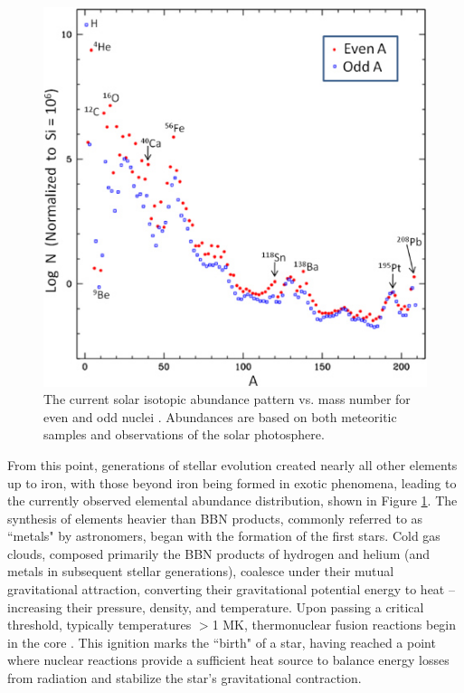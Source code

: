 \begin{figure}
\includegraphics[width=\linewidth]{figures/abundances.jpg}
\caption{The current solar isotopic abundance pattern vs. mass number for even and odd nuclei \cite{Jose2011a}. Abundances are based on both meteoritic samples and observations of the solar photosphere. }
\label{fig: abundances}
\end{figure}

From this point, generations of stellar evolution created nearly all other elements up to iron, with those beyond iron being formed in exotic phenomena, leading to the currently observed elemental abundance distribution, shown in Figure \ref{fig: abundances}. The synthesis of elements heavier than BBN products, commonly referred to as ``metals" by astronomers, began with the formation of the first stars. Cold gas clouds, composed primarily the BBN products of hydrogen and helium (and metals in subsequent stellar generations), coalesce under their mutual gravitational attraction, converting their gravitational potential energy to heat -- increasing their pressure, density, and temperature. Upon passing a critical threshold, typically temperatures $>$1 MK, thermonuclear fusion reactions begin in the core \cite{RyanNortonBook}. This ignition marks the ``birth" of a star, having reached a point where nuclear reactions provide a sufficient heat source to balance energy losses from radiation and stabilize the star's gravitational contraction. 


